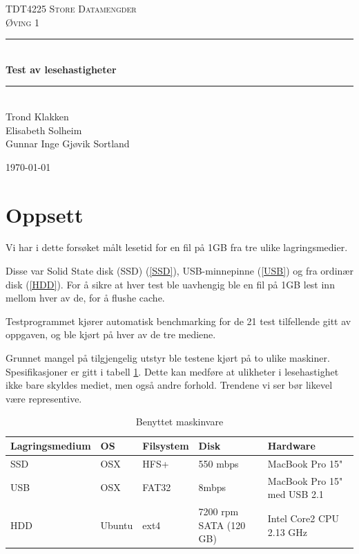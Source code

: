\documentclass[titlepage]{article}
\newcommand{\HRule}{\rule{\linewidth}{0.5mm}}
\begin{document}
\begin{titlepage}
 
\begin{center}
 
\textsc{\LARGE TDT4225 Store Datamengder}\\[1.5cm]
\textsc{\Large Øving 1}\\[0.5cm]
 
\HRule \\[0.4cm]
{ \huge \bfseries Test av lesehastigheter}\\[0.4cm]
\HRule \\[1.5cm]

Trond Klakken \\
Elisabeth Solheim \\
Gunnar Inge Gjøvik Sortland

\vfill
 
{\large \today}
 
\end{center}

\end{titlepage}

\section{Oppsett}
Vi har i dette forsøket målt lesetid for en fil på 1GB fra tre ulike
lagringsmedier.

Disse var Solid State disk (SSD) (\ref{SSD}), USB-minnepinne
(\ref{USB}) og fra ordinær disk (\ref{HDD}). For å sikre at hver test
ble uavhengig ble en fil på 1GB lest inn mellom hver av de, for å
flushe cache.

Testprogrammet kjører automatisk benchmarking for de 21 test
tilfellende gitt av oppgaven, og ble kjørt på hver av de tre mediene.

Grunnet mangel på tilgjengelig utstyr ble testene kjørt på to ulike
maskiner. Spesifikasjoner er gitt i tabell \ref{tab:hardware}. Dette
kan medføre at ulikheter i lesehastighet ikke bare skyldes mediet, men
også andre forhold. Trendene vi ser bør likevel være representive.

\begin{table}[h!]
 \caption{Benyttet maskinvare}
 \label{tab:hardware}
  \centering
  \begin{tabular}{|l|l|l|l|l|}
\hline
\textbf{Lagringsmedium} & \textbf{OS} & Filsystem  & Disk & Hardware \\
\hline
\hline
SSD & OSX    & HFS+  & 550 mbps & MacBook Pro 15" \\
USB & OSX    & FAT32 & 8mbps    &MacBook Pro 15" med USB 2.1 \\
HDD & Ubuntu & ext4  & 7200 rpm SATA (120 GB) & Intel Core2 CPU 2.13 GHz \\

\hline
\end{tabular}
\end{table}
\end{document}
